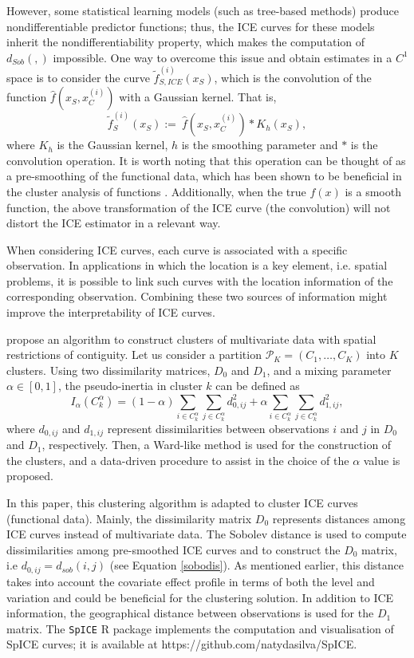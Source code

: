 \documentclass[smallextended,natbib]{svjour3}\usepackage[]{graphicx}\usepackage[]{xcolor}
\begin{document}
However, some statistical learning models (such as tree-based methods) produce nondifferentiable predictor functions; thus, the ICE curves for these models inherit the nondifferentiability property, which makes the computation of $d_{Sob}(,)$ impossible. One way to overcome this issue and obtain estimates in a $C^1$ space is to consider the curve $\widetilde{f}_{S,ICE}^{(i)}(x_S)$, which is the convolution of the function  $\hat{f}(x_S, x_C^{(i)})$  with a Gaussian kernel. That is, 
\begin{equation}\label{}
 \widetilde{f}_{S}^{(i)}(x_S) := \ \hat{f}(x_S, x_C^{(i)}) \ast K_h(x_S),
\end{equation}
where $K_h$ is the Gaussian kernel, $h$ is the smoothing parameter and $\ast$ is the convolution operation. It is worth noting that this operation can be thought of as a pre-smoothing of the functional data, which has been shown to be beneficial in the cluster analysis of functions \citep{hitchcock2007effect}. Additionally, when the true $f(x)$ is a smooth function, the above transformation of the ICE curve (the convolution) will not distort the ICE estimator in a relevant way. 

When considering ICE curves, each curve is associated with a specific observation. In applications in which the location is a key element, i.e. spatial problems, it is possible to link such curves with the location information of the corresponding observation. Combining these two sources of information might improve the interpretability of ICE curves. 

\cite{chavent2018} propose an algorithm to construct clusters of multivariate data with spatial restrictions of contiguity. 
Let us consider a partition $\mathcal{P}_K = (C_1 ,\ldots , C_K )$ into $K$ clusters.  Using two dissimilarity matrices, $D_0$ and $D_1$, and a mixing parameter $\alpha \in [0,1]$, the pseudo-inertia in cluster $k$ can be defined as 
$$I_{\alpha} \left( C^{\alpha} _k \right)=  (1-\alpha) \sum_{i \in C^{\alpha}_k} \sum_{j \in C^{\alpha}_k} d^2_{0,ij}+\alpha \sum_{i \in C^{\alpha}_k} \sum_{j \in C^{\alpha}_k}d^2_{1,ij},$$
where $d_{0,ij}$ and $d_{1,ij}$ represent dissimilarities between observations $i$ and $j$ in $D_0$ and $D_1$, respectively. Then, a Ward-like method \citep{ward1963hierarchical} is used for the construction of the clusters, and a data-driven procedure to assist in the choice of the $\alpha$ value is proposed. 

In this paper, this clustering algorithm is adapted to cluster ICE curves (functional data). Mainly, the dissimilarity matrix $D_0$ represents distances among ICE curves instead of multivariate data. The Sobolev distance is used to compute dissimilarities among pre-smoothed ICE curves and to construct the $D_0$ matrix, i.e $d_{0,ij} = d_{sob}(i, j)$ (see Equation \eqref{sobodis}). As mentioned earlier, this distance takes into account the covariate effect profile in terms of both the level and variation and could be beneficial for the clustering solution. In addition to ICE information, the geographical distance between 
observations is used for the $D_1$ matrix. The \texttt{SpICE} R package implements the computation and visualisation of SpICE curves; it is available at  https://github.com/natydasilva/SpICE. 
\end{document}
